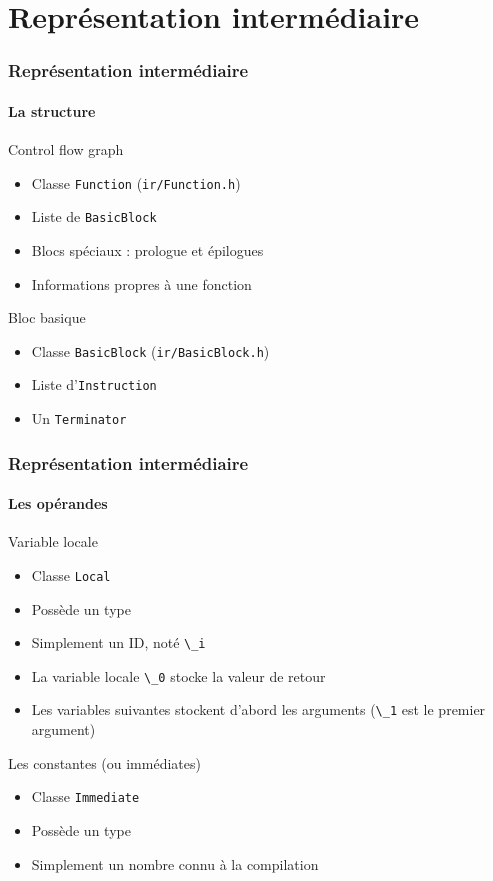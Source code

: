 \documentclass{beamer}
\newcommand*{\local}[1]{\lstinline|\_#1|}
\begin{document}
\section{Représentation intermédiaire}

\begin{frame}
    \frametitle{Représentation intermédiaire}
    \framesubtitle{La structure}

    \begin{block}{Control flow graph}
        \begin{itemize}
            \item Classe \lstinline{Function} (\lstinline{ir/Function.h})
            \item Liste de \lstinline{BasicBlock} 
            \item Blocs spéciaux : prologue et épilogues
            \item Informations propres à une fonction
        \end{itemize}
    \end{block}
    \pause
    \begin{block}{Bloc basique}
        \begin{itemize}
            \item Classe \lstinline{BasicBlock} (\lstinline{ir/BasicBlock.h})
            \item Liste d'\lstinline{Instruction} 
            \item Un \lstinline{Terminator}
        \end{itemize}
    \end{block}
\end{frame}

\begin{frame}
    \frametitle{Représentation intermédiaire}
    \framesubtitle{Les opérandes}
    \begin{block}{Variable locale}
        \begin{itemize}
            \item Classe \lstinline{Local}
            \item Possède un type
            \item Simplement un ID, noté \local{i}
            \item La variable locale \local{0} stocke la valeur de retour
            \item Les variables suivantes stockent d'abord les arguments (\local{1} est le premier argument)
        \end{itemize}
    \end{block}
    \pause
    \begin{block}{Les constantes (ou immédiates)}
        \begin{itemize}
            \item Classe \lstinline{Immediate}
            \item Possède un type
            \item Simplement un nombre connu à la compilation
        \end{itemize}
    \end{block}
\end{frame}
\end{document}
